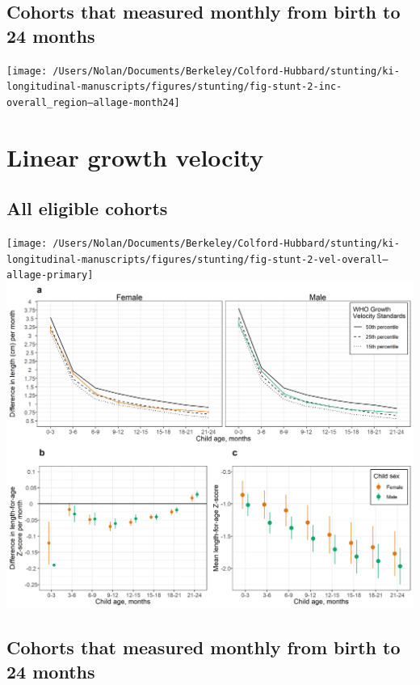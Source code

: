 \documentclass[9pt,]{book}
\begin{document}
\subsection{Cohorts that measured monthly from birth to 24
months}\label{cohorts-that-measured-monthly-from-birth-to-24-months-2}

\texttt{[image: /Users/Nolan/Documents/Berkeley/Colford-Hubbard/stunting/ki-longitudinal-manuscripts/figures/stunting/fig-stunt-2-inc-overall\_region--allage-month24]}

\section{Linear growth velocity}\label{linear-growth-velocity}

\subsection{All eligible cohorts}\label{all-eligible-cohorts-3}

\texttt{[image: /Users/Nolan/Documents/Berkeley/Colford-Hubbard/stunting/ki-longitudinal-manuscripts/figures/stunting/fig-stunt-2-vel-overall--allage-primary]}
\includegraphics[width=41.67in]{figure-copies/fig-stunt-2-vel-overall--allage-primary}

\subsection{Cohorts that measured monthly from birth to 24
months}\label{cohorts-that-measured-monthly-from-birth-to-24-months-3}
\end{document}
